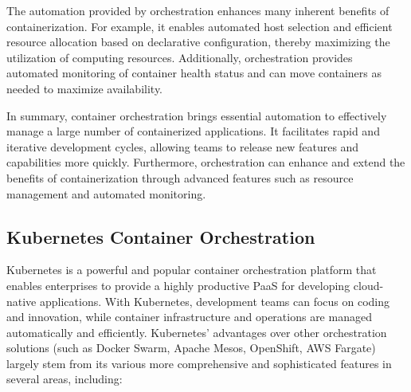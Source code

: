 The automation provided by orchestration enhances many inherent benefits of containerization. For example, it enables automated host selection and efficient resource allocation based on declarative configuration, thereby maximizing the utilization of computing resources. Additionally, orchestration provides automated monitoring of container health status and can move containers as needed to maximize availability.

In summary, container orchestration brings essential automation to effectively manage a large number of containerized applications. It facilitates rapid and iterative development cycles, allowing teams to release new features and capabilities more quickly. Furthermore, orchestration can enhance and extend the benefits of containerization through advanced features such as resource management and automated monitoring.

\subsection{Kubernetes Container Orchestration}

Kubernetes is a powerful and popular container orchestration platform that enables enterprises to provide a highly productive PaaS for developing cloud-native applications. With Kubernetes, development teams can focus on coding and innovation, while container infrastructure and operations are managed automatically and efficiently. Kubernetes' advantages over other orchestration solutions (such as Docker Swarm, Apache Mesos, OpenShift, AWS Fargate) largely stem from its various more comprehensive and sophisticated features in several areas, including:

